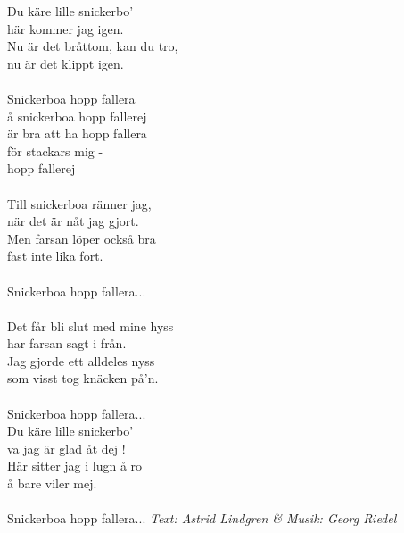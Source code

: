 \vspace{10pt}
Du käre lille snickerbo'\\
här kommer jag igen.\\
Nu är det bråttom, kan du tro,\\
nu är det klippt igen.\\
\\
Snickerboa hopp fallera\\
å snickerboa hopp fallerej\\
är bra att ha hopp fallera\\
för stackars mig -\\
hopp fallerej\\
\\
Till snickerboa ränner jag,\\
när det är nåt jag gjort.\\
Men farsan löper också bra\\
fast inte lika fort.\\
\\
Snickerboa hopp fallera...\\
\\
Det får bli slut med mine hyss\\
har farsan sagt i från.\\
Jag gjorde ett alldeles nyss\\
som visst tog knäcken på'n.\\
\\
Snickerboa hopp fallera...
\\
Du käre lille snickerbo'\\
va jag är glad åt dej !\\
Här sitter jag i lugn å ro\\
å bare viler mej.\\
\\
Snickerboa hopp fallera...
\vspace{10pt}
{\footnotesize\textit{Text: Astrid Lindgren \& Musik: Georg Riedel}}
